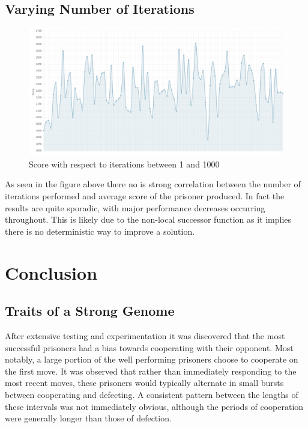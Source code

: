 \documentclass[12pt]{article}
\begin{document}
\subsection{Varying Number of Iterations}
\begin{figure}[h]
    \centering
    \includegraphics[scale=0.4]{figures/hill_climb.png}
    \caption{Score with respect to iterations between 1 and 1000}
\end{figure}

As seen in the figure above there no is strong correlation between the number
of iterations performed and average score of the prisoner produced.  In fact the results
are quite sporadic, with major performance decreases occurring throughout.  This is
likely due to the non-local successor function as it implies there is no deterministic way
to improve a solution.

\pagebreak

\section{Conclusion}

\subsection{Traits of a Strong Genome}
After extensive testing and experimentation it was discovered that the most successful prisoners
had a bias towards cooperating with their opponent. Most notably, a large portion of
the well performing prisoners choose to cooperate on the first move.
It was observed that rather than immediately responding to the most recent moves, these prisoners would
typically alternate in small bursts between cooperating and defecting. A consistent
pattern between the lengths of these intervals was not immediately obvious, although
the periods of cooperation were generally longer than those of defection.
\end{document}
